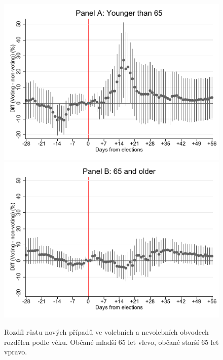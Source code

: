   
\begin{figure}
    \centering
    \includegraphics[scale=0.58]{Covid+_growth_rate14_less65.pdf} 
    \includegraphics[scale=0.58]{Covid+_growth_rate14_older65.pdf} 
    \caption{Rozdíl růstu nových případů ve volebních a nevolebních obvodech rozdělen podle věku. Občané mladší 65 let vlevo, občané starší 65 let vpravo.}
 \label{fig:heterogen_age}
\end{figure}
